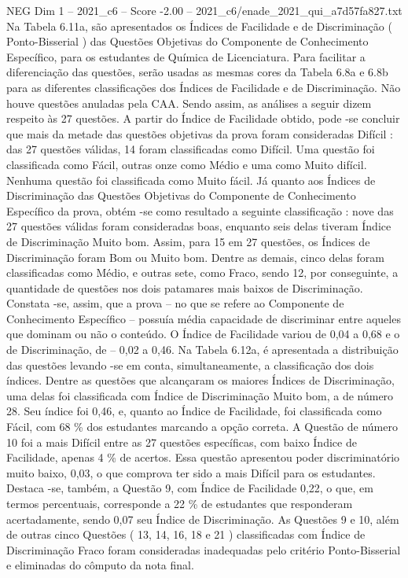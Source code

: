 \begin{textsample}{NEG Dim 1 – 2021\_c6 – Score -2.00 – 2021\_c6/enade\_2021\_qui\_a7d57fa827.txt}
Na Tabela 6.11a, são apresentados os Índices de Facilidade e de Discriminação ( Ponto-Bisserial ) das Questões Objetivas do Componente de Conhecimento Específico, para os estudantes de Química de Licenciatura.
Para facilitar a diferenciação das questões, serão usadas as mesmas cores da Tabela 6.8a e 6.8b para as diferentes classificações dos Índices de Facilidade e de Discriminação.
Não houve questões anuladas pela CAA.
Sendo assim, as análises a seguir dizem respeito às 27 questões.
A partir do Índice de Facilidade obtido, pode -se concluir que mais da metade das questões objetivas da prova foram consideradas Difícil : das 27 questões válidas, 14 foram classificadas como Difícil.
Uma questão foi classificada como Fácil, outras onze como Médio e uma como Muito difícil.
Nenhuma questão foi classificada como Muito fácil.
Já quanto aos Índices de Discriminação das Questões Objetivas do Componente de Conhecimento Específico da prova, obtém -se como resultado a seguinte classificação : nove das 27 questões válidas foram consideradas boas, enquanto seis delas tiveram Índice de Discriminação Muito bom.
Assim, para 15 em 27 questões, os Índices de Discriminação foram Bom ou Muito bom.
Dentre as demais, cinco delas foram classificadas como Médio, e outras sete, como Fraco, sendo 12, por conseguinte, a quantidade de questões nos dois patamares mais baixos de Discriminação.
Constata -se, assim, que a prova – no que se refere ao Componente de Conhecimento Específico – possuía média capacidade de discriminar entre aqueles que dominam ou não o conteúdo.
O Índice de Facilidade variou de 0,04 a 0,68 e o de Discriminação, de – 0,02 a 0,46.
Na Tabela 6.12a, é apresentada a distribuição das questões levando -se em conta, simultaneamente, a classificação dos dois índices.
Dentre as questões que alcançaram os maiores Índices de Discriminação, uma delas foi classificada com Índice de Discriminação Muito bom, a de número 28.
Seu índice foi 0,46, e, quanto ao Índice de Facilidade, foi classificada como Fácil, com 68 \% dos estudantes marcando a opção correta.
A Questão de número 10 foi a mais Difícil entre as 27 questões específicas, com baixo Índice de Facilidade, apenas 4 \% de acertos.
Essa questão apresentou poder discriminatório muito baixo, 0,03, o que comprova ter sido a mais Difícil para os estudantes.
Destaca -se, também, a Questão 9, com Índice de Facilidade 0,22, o que, em termos percentuais, corresponde a 22 \% de estudantes que responderam acertadamente, sendo 0,07 seu Índice de Discriminação.
As Questões 9 e 10, além de outras cinco Questões ( 13, 14, 16, 18 e 21 ) classificadas com Índice de Discriminação Fraco foram consideradas inadequadas pelo critério Ponto-Bisserial e eliminadas do cômputo da nota final.

\end{textsample}
